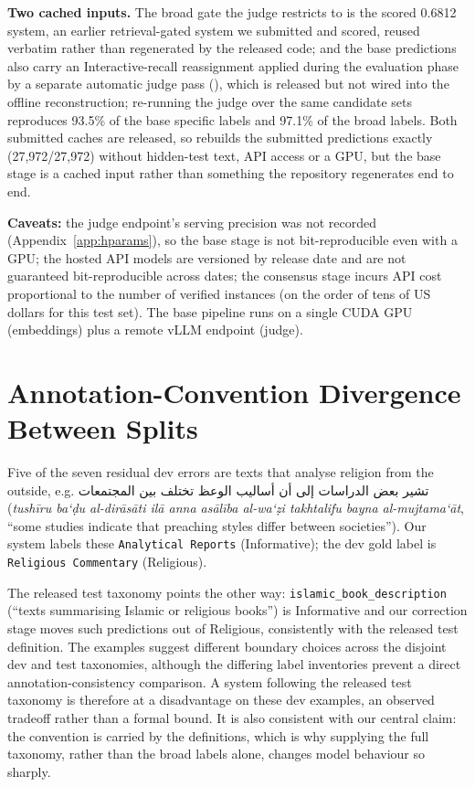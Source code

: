 \documentclass[11pt]{article}
\newcommand{\ar}[1]{\textarabic{#1}}
\begin{document}
\textbf{Two cached inputs.} The broad gate the judge restricts to is the scored 0.6812
system, an earlier retrieval-gated system we submitted and scored, reused verbatim rather
than regenerated by the released code; and the base
predictions also carry an Interactive-recall reassignment applied during the
evaluation phase by a separate automatic judge pass
(), which is released but not wired into the offline
reconstruction; re-running the judge over the same candidate sets reproduces 93.5\% of the base
specific labels and 97.1\% of the broad labels. Both submitted caches are released, so
 rebuilds the submitted predictions exactly (27{,}972/27{,}972)
without hidden-test text, API access or a GPU, but the base stage is a cached input rather than
something the repository regenerates end to end.

\textbf{Caveats:} the judge endpoint's serving precision was not
recorded (Appendix~\ref{app:hparams}), so the base stage is not bit-reproducible even with a
GPU; the hosted API models are versioned by release date and are not guaranteed
bit-reproducible across dates; the consensus stage incurs API cost proportional to the number of verified
instances (on the order of tens of US dollars for this test set). The base pipeline runs on
a single CUDA GPU (embeddings) plus a remote vLLM endpoint (judge).


\section{Annotation-Convention Divergence Between Splits}
\label{app:convention}
Five of the seven residual dev errors are texts that analyse religion from the outside, e.g.
\ar{تشير بعض الدراسات إلى أن أساليب الوعظ تختلف بين المجتمعات}
(\emph{tush\=iru ba`\d{d}u al-dir\=as\=ati il\=a anna as\=al\=iba al-wa`\d{z}i takhtalifu bayna
al-mujtama`\=at}, ``some studies indicate that preaching styles differ between societies''). Our system labels these \texttt{Analytical
Reports} (Informative); the dev gold label is \texttt{Religious Commentary} (Religious).

The released test taxonomy points the other way:
\texttt{islamic\_book\_description} (``texts summarising Islamic or religious books'') is
Informative and our correction stage moves such predictions out of Religious, consistently with
the released test definition. The examples suggest different boundary choices across the
disjoint dev and test taxonomies, although the differing label inventories prevent a direct
annotation-consistency comparison. A system following the released test taxonomy is therefore at a disadvantage on these dev
examples, an observed tradeoff rather than a formal bound. It is also consistent with our central claim: the convention is carried by the
definitions, which is why supplying the full taxonomy, rather than the broad labels alone,
changes model behaviour so sharply.
\end{document}
